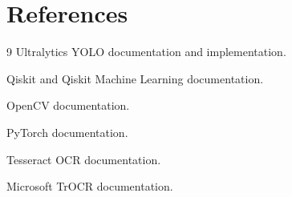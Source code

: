 \documentclass[12pt,a4paper]{article}
\begin{document}
\section{References}

\begin{thebibliography}{9}
Ultralytics YOLO documentation and implementation.

Qiskit and Qiskit Machine Learning documentation.

OpenCV documentation.

PyTorch documentation.

Tesseract OCR documentation.

Microsoft TrOCR documentation.
\end{thebibliography}
\end{document}

